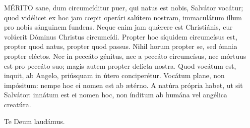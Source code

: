 

\lettrine[lines=2]{M}{ÉRITO} sane, dum circumcíditur puer, qui natus est nobis, Salvátor vocátur; quod vidélicet ex hoc jam cœpit operári salútem nostram, immaculátum illum pro nobis sánguinem fundens. Neque enim jam quǽrere est Christiánis, cur volúerit Dóminus Christus circumcídi. Propter hoc síquidem circumcísus est, propter quod natus, propter quod passus. Nihil horum propter se, sed ómnia propter eléctos. Nec in peccáto génitus, nec a peccáto circumcísus, nec mórtuus est pro peccáto suo; magis autem propter delícta nostra. Quod vocátum est, inquit, ab Angelo, priúsquam in útero conciperétur. Vocátum plane, non impósitum: nempe hoc ei nomen est ab ætérno. A natúra própria habet, ut sit Salvátor: innátum est ei nomen hoc, non índitum ab humána vel angélica creatúra.

Te Deum laudámus.

